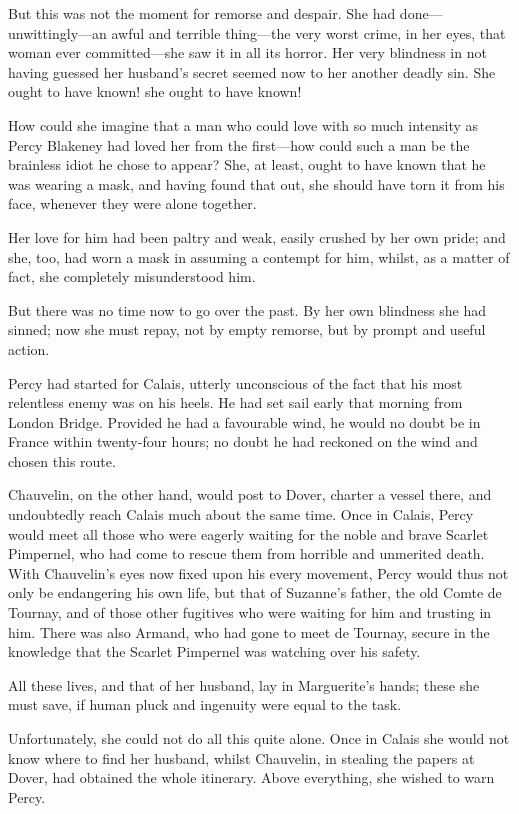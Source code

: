 \documentclass[paper=5.5in:8.5in,BCOR=7mm,twoside,DIV=calc,12pt,usegeometry,chapterprefix,endperiod,headings=big]{scrbook}
\begin{document}
But this was not the moment for remorse and despair. She had done---unwittingly---an awful and terrible thing---the very worst crime, in her eyes, that woman ever \newline committed---she saw it in all its horror. Her very blindness in not having guessed her husband's secret seemed now to her another deadly sin. She ought to have known! she ought to have known!

How could she imagine that a man who could love with so much intensity as Percy Blakeney had loved her from the first---how could such a man be the brainless idiot he chose to appear? She, at least, ought to have known that he was wearing a mask, and having found that out, she should have torn it from his face, whenever they were alone together.

Her love for him had been paltry and weak, easily crushed by her own pride; and she, too, had worn a mask in assuming a contempt for him, whilst, as a matter of fact, she completely misunderstood him.

But there was no time now to go over the past. By her own blindness she had sinned; now she must repay, not by empty remorse, but by prompt and useful action.

Percy had started for Calais, utterly unconscious of the fact that his most relentless enemy was on his heels. He had set sail early that morning from London Bridge. Provided he had a favourable wind, he would no doubt be in France within twenty-four hours; no doubt he had reckoned on the wind and chosen this route.

Chauvelin, on the other hand, would post to Dover, charter a vessel there, and undoubtedly reach Calais much about the same time. Once in Calais, Percy would meet all those who were eagerly waiting for the noble and brave Scarlet Pimpernel, who had come to rescue them from horrible and unmerited death. With Chauvelin's eyes now fixed upon his every movement, Percy would thus not only be endangering his own life, but that of Suzanne's father, the old Comte de Tournay, and of those other fugitives who were waiting for him and trusting in him. There was also Armand, who had gone to meet de Tournay, secure in the knowledge that the Scarlet Pimpernel was watching over his safety.

All these lives, and that of her husband, lay in Marguerite's hands; these she must save, if human pluck and ingenuity were equal to the task.

Unfortunately, she could not do all this quite alone. Once in Calais she would not know where to find her husband, whilst Chauvelin, in stealing the papers at Dover, had obtained the whole itinerary. Above everything, she wished to warn Percy.
\end{document}
